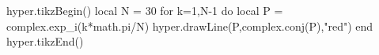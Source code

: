 \documentclass[margin=.2cm,multi,tikz]{standalone}
\begin{document}
\begin{luacode*}
hyper.tikzBegin()
local N = 30
for k=1,N-1 do
	local P = complex.exp_i(k*math.pi/N)
	hyper.drawLine(P,complex.conj(P),"red")
end
hyper.tikzEnd()
\end{luacode*}
\end{document}
